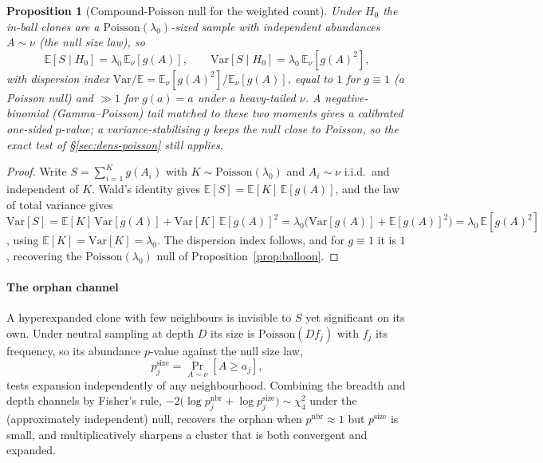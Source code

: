 \documentclass[11pt]{article}
\theoremstyle{oldplain}
\newtheorem{proposition}{Proposition}
\theoremstyle{oldrem}
\newcommand{\E}{\mathds{E}}
\begin{document}
\begin{proposition}[Compound-Poisson null for the weighted count]\label{prop:abund}
Under $H_0$ the in-ball clones are a $\mathrm{Poisson}(\lambda_0)$-sized sample with independent abundances
$A\sim\nu$ (the null size law), so
\begin{equation}\label{eq:abundmoments}
  \E[S\mid H_0]=\lambda_0\,\E_\nu[g(A)],\qquad
  \mathrm{Var}[S\mid H_0]=\lambda_0\,\E_\nu[g(A)^2],
\end{equation}
with dispersion index $\mathrm{Var}/\E=\E_\nu[g(A)^2]/\E_\nu[g(A)]$, equal to $1$ for $g\equiv1$ (a Poisson
null) and $\gg1$ for $g(a)=a$ under a heavy-tailed $\nu$. A negative-binomial (Gamma--Poisson) tail matched to
these two moments gives a calibrated one-sided $p$-value; a variance-stabilising $g$ keeps the null close to
Poisson, so the exact test of \S\ref{sec:dens-poisson} still applies.
\end{proposition}
\begin{proof}
Write $S=\sum_{i=1}^{K}g(A_i)$ with $K\sim\mathrm{Poisson}(\lambda_0)$ and $A_i\sim\nu$ i.i.d.\ and
independent of $K$. Wald's identity gives $\E[S]=\E[K]\,\E[g(A)]$, and the law of total variance gives
$\mathrm{Var}[S]=\E[K]\,\mathrm{Var}[g(A)]+\mathrm{Var}[K]\,\E[g(A)]^2
=\lambda_0\big(\mathrm{Var}[g(A)]+\E[g(A)]^2\big)=\lambda_0\,\E[g(A)^2]$, using
$\E[K]=\mathrm{Var}[K]=\lambda_0$. The dispersion index follows, and for $g\equiv1$ it is $1$, recovering the
$\mathrm{Poisson}(\lambda_0)$ null of Proposition~\ref{prop:balloon}.
\end{proof}

\paragraph{The orphan channel} A hyperexpanded clone with few neighbours is invisible to $S$ yet significant
on its own. Under neutral sampling at depth $D$ its size is $\mathrm{Poisson}(Df_j)$ with $f_j$ its frequency,
so its abundance $p$-value against the null size law,
\begin{equation}\label{eq:orphan}
  p^{\mathrm{size}}_j=\Pr_{A\sim\nu}[A\ge a_j],
\end{equation}
tests expansion independently of any neighbourhood. Combining the breadth and depth channels by Fisher's rule,
$-2\big(\log p^{\mathrm{nbr}}_j+\log p^{\mathrm{size}}_j\big)\sim\chi^2_4$ under the (approximately
independent) null, recovers the orphan when $p^{\mathrm{nbr}}\!\approx\!1$ but $p^{\mathrm{size}}$ is small,
and multiplicatively sharpens a cluster that is both convergent and expanded.
\end{document}
